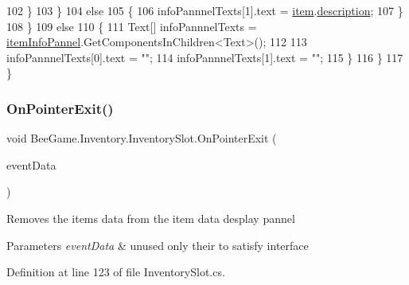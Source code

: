 \begin{DoxyCode}
102                         \}
103                     \}
104                     \textcolor{keywordflow}{else}
105                     \{
106                         infoPannnelTexts[1].text = \hyperlink{class_bee_game_1_1_inventory_1_1_inventory_slot_a31b201e7eef9ed0001a447b3f76a7a81}{item}.\hyperlink{struct_bee_game_1_1_items_1_1_item_a3173b5fb0a51e9063335e5cbf93c2e1b}{description};
107                     \}
108                 \}
109                 \textcolor{keywordflow}{else}
110                 \{
111                     Text[] infoPannnelTexts = \hyperlink{class_bee_game_1_1_inventory_1_1_inventory_slot_aa45b9de343c847b7c8d7db4163f765ec}{itemInfoPannel}.GetComponentsInChildren<Text>();
112 
113                     infoPannnelTexts[0].text = \textcolor{stringliteral}{""};
114                     infoPannnelTexts[1].text = \textcolor{stringliteral}{""};
115                 \}
116             \}
117         \}
\end{DoxyCode}
\mbox{\label{class_bee_game_1_1_inventory_1_1_inventory_slot_a13a4046ae2c80a52f3b1ed44fc1a5ef1}} 
\subsubsection{\texorpdfstring{On\+Pointer\+Exit()}{OnPointerExit()}}
{\footnotesize\ttfamily void Bee\+Game.\+Inventory.\+Inventory\+Slot.\+On\+Pointer\+Exit (\begin{DoxyParamCaption}\item[{Pointer\+Event\+Data}]{event\+Data }\end{DoxyParamCaption})}



Removes the items data from the item data desplay pannel 


\begin{DoxyParams}{Parameters}
{\em event\+Data} & unused only their to satisfy interface\\
\hline
\end{DoxyParams}


Definition at line 123 of file Inventory\+Slot.\+cs.


